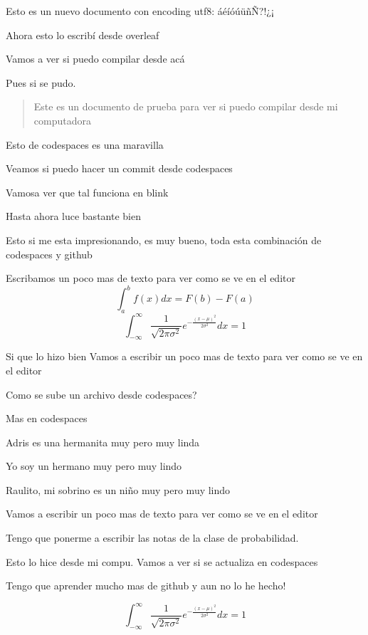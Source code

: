 \documentclass{article}
\begin{document}
	



	Esto es un nuevo documento con encoding utf8: áéíóúüñÑ?!¿¡

 Ahora esto lo escribí desde overleaf
 
 Vamos a ver si puedo compilar desde acá

 Pues si se pudo.

 \begin{abstract}
	Este es un documento de prueba para ver si puedo compilar desde mi computadora
 \end{abstract}

 Esto de codespaces es una maravilla


Veamos si puedo hacer un commit desde codespaces

Vamosa ver que tal funciona en blink


Hasta ahora luce bastante bien

Esto si me esta impresionando, es muy bueno, toda esta combinación de codespaces y github

Escribamos un poco mas de texto para ver como se ve en el editor
\begin{equation}
	\int_{a}^{b} f(x) dx = F(b) - F(a)
\end{equation}
\begin{equation}
	\int_{-\infty}^{\infty} \frac{1}{\sqrt{2\pi\sigma^2}} e^{-\frac{(x-\mu)^2}{2\sigma^2}} dx = 1
\end{equation}

Si que lo hizo bien
Vamos a escribir un poco mas de texto para ver como se ve en el editor


Como se sube un archivo desde codespaces?

Mas en codespaces

Adris es una hermanita muy pero muy linda

Yo soy un hermano muy pero muy lindo

Raulito, mi sobrino es un niño muy pero muy lindo

Vamos a escribir un poco mas de texto para ver como se ve en el editor

Tengo que ponerme a escribir las notas de la clase de probabilidad.

Esto lo hice desde mi compu. Vamos a ver si se actualiza en codespaces


Tengo que aprender mucho mas de github y aun no lo he hecho!

$$
\int_{-\infty}^{\infty} \frac{1}{\sqrt{2\pi\sigma^2}} e^{-\frac{(x-\mu)^2}{2\sigma^2}} dx = 1
$$
\end{document}
